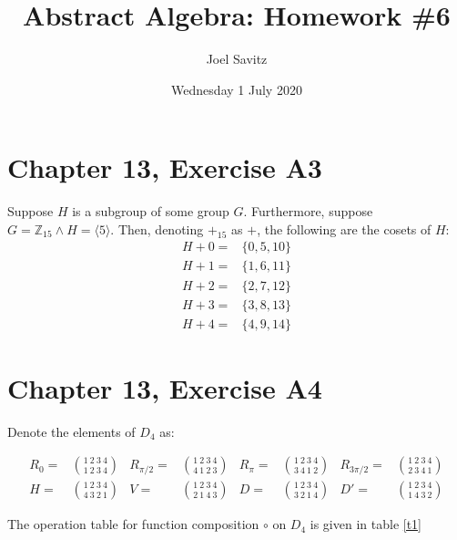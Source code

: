 \documentclass[12pt]{article}
\title{Abstract Algebra: Homework \#6}
\author{Joel Savitz}
\date{Wednesday 1 July 2020}
\newcommand{\ints}{\mathbb{Z}}
\begin{document}
\maketitle

\section{Chapter 13, Exercise A3}

Suppose $H$ is a subgroup of some group $G$.
Furthermore, suppose
$G = \ints_{15} \land H = \langle 5 \rangle$.
Then,
denoting $+_{15}$ as $+$,
the following are the cosets of $H$:
\begin{align*}
	H + 0 = & \{0, 5, 10 \} \\
	H + 1 = & \{1, 6, 11 \} \\
	H + 2 = & \{2, 7, 12 \} \\
	H + 3 = & \{3, 8, 13 \} \\
	H + 4 = & \{4, 9, 14 \}
\end{align*}

\section{Chapter 13, Exercise A4}

Denote the elements of $D_4$ as:

\begin{align}
	\label{topperm}
	R_0 = & \binom{1\ 2\ 3\ 4}{1\ 2\ 3\ 4} &
	R_{\pi/2} = & \binom{1\ 2\ 3\ 4}{4\ 1\ 2\ 3} &
	R_{\pi} = & \binom{1\ 2\ 3\ 4}{3\ 4\ 1\ 2} &
	R_{3\pi/2} = & \binom{1\ 2\ 3\ 4}{2\ 3\ 4\ 1} \\
	\label{botperm}
	H  = & \binom{1\ 2\ 3\ 4}{4\ 3\ 2\ 1} &
	V  = & \binom{1\ 2\ 3\ 4}{2\ 1\ 4\ 3} &
	D = & \binom{1\ 2\ 3\ 4}{3\ 2\ 1\ 4} &
	D' = & \binom{1\ 2\ 3\ 4}{1\ 4\ 3\ 2}
\end{align}

The operation table for
function composition $\circ$
on $D_4$
is given in table \ref{t1}
\end{document}
